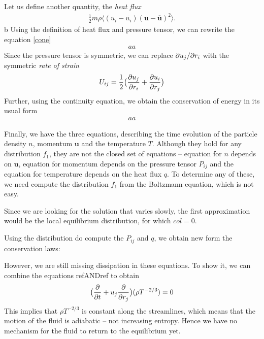 Let us define another quantity, the \textit{heat flux}
\begin{align*}
\frac{1}{2} m \rho \langle (u_i - \overline{u_i})(\bm{u} - \bm{\overline{u}})^2 \rangle.
\end{align*}b
Using the definition of heat flux and pressure tensor, we can rewrite the equation \ref{cone}
\begin{align*}
aa
\end{align*}
Since the pressure tensor is symmetric, we can replace $\partial u_j / \partial r_i$ with the symmetric \textit{rate of strain}
\begin{align*}
U_{ij} = \frac{1}{2}\big( \frac{\partial u_j}{\partial r_i} + \frac{\partial u_i}{\partial r_j} \big)
\end{align*}
Further, using the continuity equation, we obtain the conservation of energy in its usual form
\begin{align*}
aa
\end{align*}

Finally, we have the three equations, describing the time evolution of the particle density $n$, momentum $\bm{u}$ and the temperature $T$.
Although they hold for any distribution $f_1$, they are not the closed set of equations -- equation for $n$ depends on $\bm{u}$, equation for momentum depends on the pressure tensor $P_{ij}$ and the equation for temperature depends on the heat flux $q$. To determine any of these, we need compute the distribution $f_1$ from the Boltzmann equation, which is not easy.

\bigskip

Since we are looking for the solution that varies slowly, the first approximation would be the  local equilibrium distribution, for which $col=0$.
%

Using the distribution do compute the $P_{ij}$ and $q$, we obtain new form the conservation laws:

However, we are still missing dissipation in these equations. To show it, we can combine the equations refANDref to obtain
\begin{align*}
\big( \frac{\partial}{\partial t} + u_j \frac{\partial}{\partial r_j} \big) (\rho T ^{-2/3}) = 0
\end{align*}
This implies that $\rho T^{-2/3}$ is constant along the streamlines, which means that the motion of the fluid is adiabatic -- not increasing entropy. Hence we have no mechanism for the fluid to return to the equilibrium yet.


